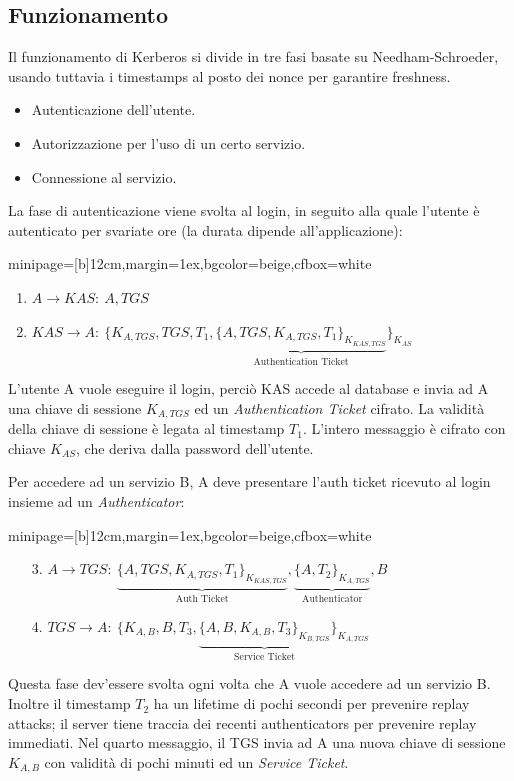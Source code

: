 \documentclass[a4paper, 11pt, notitlepage, fleqn]{report}
\newcommand{\fromto}[2]{#1\rightarrow #2\!:\ }
\newenvironment{colbox}[2]%
{%
	\par\noindent\hspace{10pt}
	\begin{adjustbox}{minipage=[b]{#2},margin=1ex,bgcolor=#1,cfbox=white}
}{%
	\end{adjustbox}\newline%
}
\begin{document}
\subsection{Funzionamento}
Il funzionamento di Kerberos si divide in tre fasi basate su Needham-Schroeder, usando tuttavia i timestamps al posto dei nonce per garantire freshness.
\begin{itemize}
	\item Autenticazione dell'utente.
	\item Autorizzazione per l'uso di un certo servizio.
	\item Connessione al servizio.
\end{itemize}
La fase di autenticazione viene svolta al login, in seguito alla quale l'utente è autenticato per svariate ore (la durata dipende all'applicazione):
\begin{colbox}{beige}{12cm}
	\begin{enumerate}
		\item $\fromto{A}{KAS}A,TGS$
		\item $\fromto{KAS}{A}\{K_{A,T\!G\!S},TGS,T_1,
		\underbrace{\{A,TGS,K_{A,T\!G\!S},T_1\}_{K_{K\!A\!S,T\!G\!S}}}_{\mbox{Authentication Ticket}}\}_{K_{AS}}$
	\end{enumerate}
\end{colbox}
L'utente A vuole eseguire il login, perciò KAS accede al database e invia ad A una chiave di sessione $K_{A,TGS}$ ed un \emph{Authentication Ticket} cifrato.
La validità della chiave di sessione è legata al timestamp $T_1$. L'intero messaggio è cifrato con chiave $K_{AS}$, che deriva dalla password dell'utente.

Per accedere ad un servizio B, A deve presentare l'auth ticket ricevuto al login insieme ad un \emph{Authenticator}:
\begin{colbox}{beige}{12cm}
	\begin{enumerate}
		\item[3.] $\fromto{A}{TGS}\underbrace{\{A,TGS,K_{A,T\!G\!S},T_1\}_{K_{K\!A\!S,T\!G\!S}}}_{\mbox{Auth Ticket}}, \underbrace{\{A,T_2\}_{K_{A,T\!G\!S}}}_{\mbox{Authenticator}}, B$
		\item[4.] $\fromto{TGS}{A}\{K_{A,B},B,T_3,\underbrace{\{A,B,K_{A,B},T_3\}_{K_{B,T\!G\!S}}}_{\mbox{Service Ticket}}\}_{K_{A,T\!G\!S}}$
	\end{enumerate}
\end{colbox}
Questa fase dev'essere svolta ogni volta che A vuole accedere ad un servizio B. Inoltre il timestamp $T_2$ ha un lifetime di pochi secondi per prevenire replay attacks; il server tiene traccia dei recenti authenticators per prevenire replay immediati. Nel quarto messaggio, il TGS invia ad A una nuova chiave di sessione $K_{A,B}$ con validità di pochi minuti ed un \emph{Service Ticket}.
\end{document}
